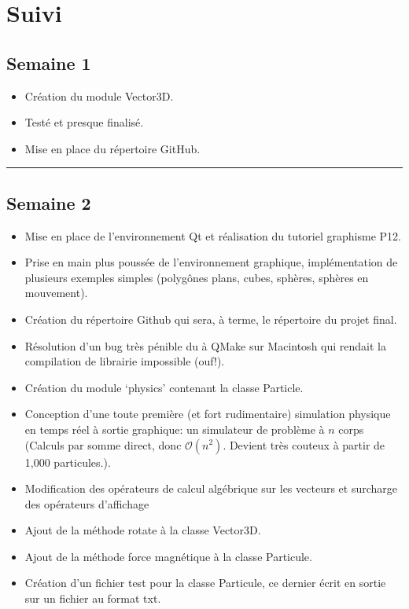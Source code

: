 \documentclass[12pt, letterpaper, twoside]{article}
\begin{document}
\section{Suivi}

\subsection*{Semaine 1}
\begin{itemize}
\item Création du module Vector3D.
\item Testé et presque finalisé.
\item Mise en place du répertoire GitHub.
\end{itemize}

\rule{\textwidth}{0.4pt}

\subsection*{Semaine 2}
\begin{itemize}
	\item Mise en place de l’environnement Qt et réalisation du tutoriel graphisme P12.
	\item Prise en main plus poussée de l’environnement graphique, implémentation de plusieurs exemples simples (polygônes plans, cubes, sphères, sphères en mouvement).
	\item Création du répertoire Github qui sera, à terme, le répertoire du projet final.
	\item Résolution d’un bug très pénible du à QMake sur Macintosh qui rendait la compilation de librairie impossible (ouf!).
	\item Création du module `physics' contenant la classe Particle.
	\item Conception d’une toute première (et fort rudimentaire) simulation physique en temps réel à sortie graphique: un simulateur de problème à $n$ corps (Calculs par somme direct, donc $\mathcal{O}(n^2)$. Devient très couteux à partir de 1,000 particules.).
	\item Modification des opérateurs de calcul algébrique sur les vecteurs et surcharge des opérateurs d’affichage
	\item Ajout de la méthode rotate à la classe Vector3D.
	\item Ajout de la méthode force magnétique à la classe Particule.
	\item Création d’un fichier test pour la classe Particule, ce dernier écrit en sortie sur un fichier au format txt.
\end{itemize}
\end{document}

